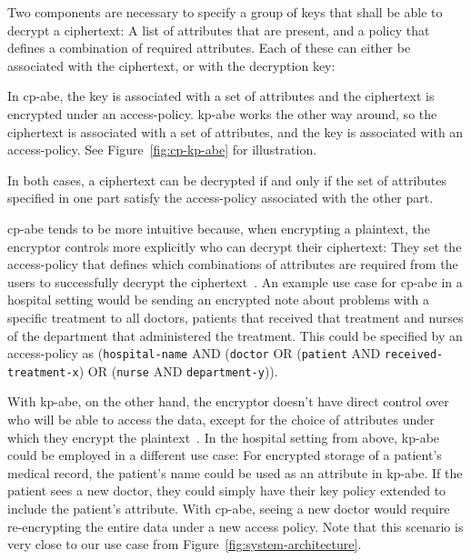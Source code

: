 Two components are necessary to specify a group of keys that shall be able to decrypt a ciphertext:
A list of attributes that are present, and a policy that defines a combination of required attributes. 
Each of these can either be associated with the ciphertext, or with the decryption key:

In \acrfull{cp-abe}, the key is associated with a set of attributes and the ciphertext is encrypted under an \gls{access-policy}.
\acrfull{kp-abe} works the other way around, so the ciphertext is associated with a set of attributes, and the key is associated with an \gls{access-policy}.
See Figure~\ref{fig:cp-kp-abe} for illustration.

In both cases, a ciphertext can be decrypted if and only if the set of attributes specified in one part satisfy the \gls{access-policy} associated with the other part.

\acrshort{cp-abe} tends to be more intuitive because, when encrypting a plaintext, the encryptor controls more explicitly who can decrypt their ciphertext:
They set the \gls{access-policy} that defines which combinations of attributes are required from the users to successfully decrypt the ciphertext~\cite{bethencourt_ciphertext-policy_2007}.
An example use case for \acrshort{cp-abe} in a hospital setting would be sending an encrypted note about problems with a specific treatment to all doctors, patients that received that treatment and nurses of the department that administered the treatment.
This could be specified by an \gls{access-policy} as (\texttt{hospital-name} AND (\texttt{doctor} OR (\texttt{patient} AND \texttt{received-treatment-x}) OR (\texttt{nurse} AND \texttt{department-y})).

With \acrshort{kp-abe}, on the other hand, the encryptor doesn't have direct control over who will be able to access the data, except for the choice of attributes under which they encrypt the plaintext~\cite{bethencourt_ciphertext-policy_2007}.
In the hospital setting from above, \acrshort{kp-abe} could be employed in a different use case: For encrypted storage of a patient's medical record, the patient's name could be used as an attribute in \acrshort{kp-abe}.
If the patient sees a new doctor, they could simply have their key policy extended to include the patient's attribute.
With \acrshort{cp-abe}, seeing a new doctor would require re-encrypting the entire data under a new access policy.
Note that this scenario is very close to our use case from Figure~\ref{fig:system-architecture}.

